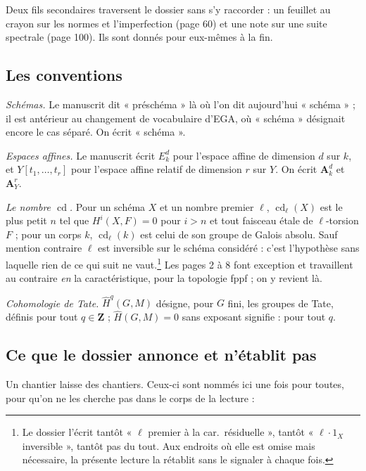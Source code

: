 \documentclass[11pt,a4paper]{article}
\begin{document}
Deux fils secondaires traversent le dossier sans s'y raccorder : un feuillet au
crayon sur les normes et l'imperfection (page 60) et une note sur une suite
spectrale (page 100). Ils sont donnés pour eux-mêmes à la fin.

\subsection*{Les conventions}

\emph{Schémas.} Le manuscrit dit « préschéma » là où l'on dit aujourd'hui
« schéma » ; il est antérieur au changement de vocabulaire d'EGA, où
« schéma » désignait encore le cas séparé. On écrit « schéma ».

\emph{Espaces affines.} Le manuscrit écrit $E^d_k$ pour l'espace affine de
dimension $d$ sur $k$, et $Y[t_1, \dots, t_r]$ pour l'espace affine relatif de
dimension $r$ sur $Y$. On écrit $\mathbf{A}^d_k$ et $\mathbf{A}^r_Y$.

\emph{Le nombre $\operatorname{cd}$.} Pour un schéma $X$ et un nombre premier
$\ell$, $\operatorname{cd}_{\ell}(X)$ est le plus petit $n$ tel que
$H^i(X,F) = 0$ pour $i > n$ et tout faisceau étale de $\ell$-torsion $F$ ; pour
un corps $k$, $\operatorname{cd}_{\ell}(k)$ est celui de son groupe de Galois
absolu. Sauf mention contraire $\ell$ est inversible sur le schéma considéré :
c'est l'hypothèse sans laquelle rien de ce qui suit ne vaut.\footnote{Le dossier
l'écrit tantôt « $\ell$ premier à la car.\ résiduelle », tantôt
« $\ell \cdot 1_X$ inversible », tantôt pas du tout. Aux endroits où elle est
omise mais nécessaire, la présente lecture la rétablit sans le signaler à
chaque fois.} Les pages 2 à 8 font exception et travaillent au contraire
\emph{en} la caractéristique, pour la topologie fppf ; on y revient là.

\emph{Cohomologie de Tate.} $\widehat{H}^q(G,M)$ désigne, pour $G$ fini, les
groupes de Tate, définis pour tout $q \in \mathbf{Z}$ ; $\widehat{H}(G,M) = 0$
sans exposant signifie : pour tout $q$.

\subsection*{Ce que le dossier annonce et n'établit pas}

Un chantier laisse des chantiers. Ceux-ci sont nommés ici une fois pour toutes,
pour qu'on ne les cherche pas dans le corps de la lecture :
\end{document}
